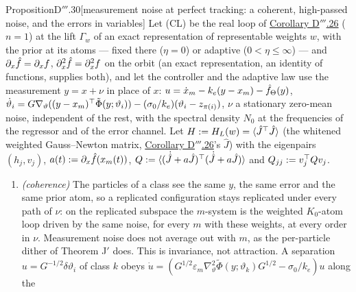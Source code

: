 \begin{thm}{Proposition}{D$'''$.30}[measurement noise at perfect tracking: a coherent, high-passed noise, and the
errors in variables]\label{res:thmDppp:30}%
Let \textup{(CL)} be the real loop of \hyperref[res:thmDppp:26]{Corollary D$'''$.26} ($n = 1$) at the lift $\Gamma_w$
of an exact representation of representable weights $w$, with the prior at its atoms --- fixed there ($\eta = 0$) or
adaptive ($0 < \eta\le\infty$) --- and $\partial_x\hat f = \partial_xf$, $\partial^2_x\hat f = \partial^2_xf$ on the
orbit (an exact representation, an identity of functions, supplies both), and let the controller and the adaptive
law use the measurement $y = x + \nu$ in place of $x$: $u = \dot x_m - k_e(y - x_m) - \hat f_\Theta(y)$,
$\dot\vartheta_i = G\nabla_\vartheta((y - x_m)^\top\tilde\Phi(y;\vartheta_i)) - (\sigma_0/k_e)(\vartheta_i - z_{\pi(i)})$,
$\nu$ a stationary zero-mean noise, independent of the rest, with the spectral density $N_0$ at the frequencies of the
regressor and of the error channel. Let $H := H_L(w) = \langle\hat J^\top\hat J\rangle$ (the whitened weighted
Gauss--Newton matrix, \hyperref[res:thmDppp:26]{Corollary D$'''$.26}'s $\hat J$) with the eigenpairs $(h_j,v_j)$,
$a(t) := \partial_x\hat f(x_m(t))$, $Q := \langle(\dot{\hat J} + a\hat J)^\top(\dot{\hat J} + a\hat J)\rangle$ and
$Q_{jj} := v_j^\top Qv_j$.
\begin{enumerate}[label=\textup{(\roman*)}]
  \item \emph{(coherence)} The particles of a class see the same $y$, the same error and the same prior atom, so a
    replicated configuration stays replicated under every path of $\nu$: on the replicated subspace the $m$-system is
    the weighted $K_0$-atom loop driven by the same noise, for every $m$ with these weights, at every order in $\nu$.
    Measurement noise does not average out with $m$, as the per-particle dither of Theorem J$'$ does. This is
    invariance, not attraction. A separation $u = G^{-1/2}\delta\vartheta_i$ of class $k$ obeys
    $\dot u = (G^{1/2}\varepsilon_m\nabla^2_\vartheta\tilde\Phi(y;\vartheta_k)G^{1/2} - \sigma_0/k_e)u$ along the

\end{enumerate}
\end{thm}
